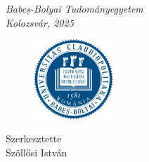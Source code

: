 \begin{titlepage}
\textit{\Large Babeș-Bolyai Tudományegyetem \\
Kolozsvár, 2025} 

\vfill 


\begin{figure}[!h]
    \centering
    \includegraphics[width = 3cm, height= 3cm]{resource/logo_ubb.png}%
\end{figure}
\vspace{0.3\baselineskip} 


{\large Szerkesztette\\  Szöllősi István\par}
\vspace{\baselineskip} 
\end{titlepage}